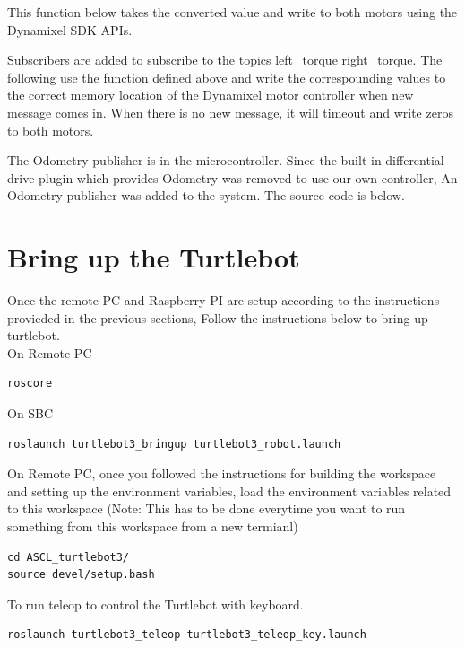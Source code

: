 \documentclass[12]{article}
\begin{document}
This function below takes the converted value and write to both motors using the Dynamixel SDK APIs. 


Subscribers are added to subscribe to the topics \/left\_torque \/right\_torque. 
The following use the function defined above and write the correspounding values to the correct memory location of the Dynamixel motor controller when new message comes in. 
When there is no new message, it will timeout and write zeros to both motors. 



The Odometry publisher is in the microcontroller. Since the built-in differential drive plugin which provides Odometry was removed to use our own controller,
An Odometry publisher was added to the system. The source code is below. 




\newpage

\section{Bring up the Turtlebot}
Once the remote PC and Raspberry PI are setup according to the instructions provieded in the previous sections, 
Follow the instructions below to bring up turtlebot.  \\
On Remote PC
\begin{lstlisting}[style=bash]
    roscore
\end{lstlisting}
On SBC
\begin{lstlisting}[style=bash]
    roslaunch turtlebot3_bringup turtlebot3_robot.launch
\end{lstlisting}

On Remote PC, once you followed the instructions for building the workspace and setting up the environment variables,  
load the environment variables related to this workspace (Note: This has to be done everytime you want to run something from this workspace from a new termianl)
\begin{lstlisting}[style=bash]
cd ASCL_turtlebot3/
source devel/setup.bash
\end{lstlisting}

To run teleop to control the Turtlebot with keyboard.
\begin{lstlisting}[style=bash]
roslaunch turtlebot3_teleop turtlebot3_teleop_key.launch
\end{lstlisting}
\end{document}
